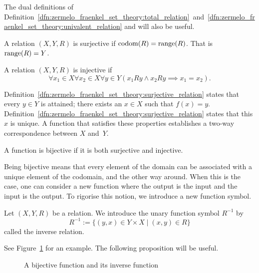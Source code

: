 \documentclass[../main.tex]{subfiles}
\begin{document}
The dual definitions of Definition~\ref{dfn:zermelo_fraenkel_set_theory:total_relation}~and~\ref{dfn:zermelo_fraenkel_set_theory:univalent_relation} and will also be useful.
\begin{definition}\label{dfn:zermelo_fraenkel_set_theory:surjective_relation}
    A relation $(X,Y,R)$ is surjective if $\operatorname{codom}(R)=\operatorname{range}(R)$. That is $\operatorname{range}(R)=Y$.
\end{definition}
\begin{definition}
    A relation $(X,Y,R)$ is injective if
    \begin{equation*}
        \forall x_1\in X\forall x_2\in X\forall y\in Y(x_1Ry\land x_2Ry\implies x_1=x_2).
    \end{equation*}
\end{definition}
Definition~\ref{dfn:zermelo_fraenkel_set_theory:surjective_relation} states that every $y\in Y$ is attained; there exists an $x\in X$ such that $f(x)=y$. Definition~\ref{dfn:zermelo_fraenkel_set_theory:surjective_relation} states that this $x$ is unique. A function that satisfies these properties establishes a two-way correspondence between $X$ and~$Y$.
\begin{definition}\label{dfn:zermelo_fraenkel_set_theory:bijective_function}
    A function is bijective if it is both surjective and injective.
\end{definition}
Being bijective means that every element of the domain can be associated with a unique element of the codomain, and the other way around. When this is the case, one can consider a new function where the output is the input and the input is the output. To rigorise this notion, we introduce a new function symbol.
\begin{definition}\label{dfn:zermelo_fraenkel_set_theory:inverse_relation}
    Let $(X,Y,R)$ be a relation. We introduce the unary function symbol $R^{-1}$ by
    \begin{equation*}
        R^{-1}:=\{(y,x)\in Y\times X\mid (x,y)\in R\}
    \end{equation*}
    called the inverse relation.
\end{definition}
See Figure~\ref{fig:zermelo_fraenkel_set_theory:bijective_function_and_inverse} for an example. The following proposition will be useful.
\begin{figure}[!htbp]
    \centering
    
    \caption{A bijective function and its inverse function}
    \label{fig:zermelo_fraenkel_set_theory:bijective_function_and_inverse}
\end{figure}
\end{document}
